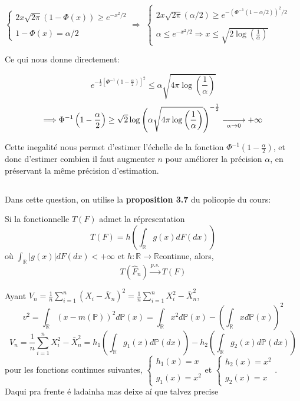 \documentclass{article}
\newcommand{\R}{\mathbb{R}}
\def\longlongrightarrow{\relbar\joinrel\relbar\joinrel\relbar\joinrel\rightarrow}
\begin{document}
$ \left\{
\begin{array}{ll}
\displaystyle 2x\sqrt{2\pi}(1-\Phi(x))\geq e^{-x^2/2} \\ \\
\displaystyle 1-\Phi(x) = \alpha/2
\end{array}
\right.
\Longrightarrow
$
$ \left\{
\begin{array}{ll}
\displaystyle 2x\sqrt{2\pi}(\alpha/2)\geq e^{-{(\Phi^{-1}(1-\alpha/2))}^2/2} \\ \\
\displaystyle \alpha \leq e^{-x^2/2} \Rightarrow x \leq \sqrt{2\log\left(\frac{1}{\alpha}\right)}
\end{array}
\right.
$


Ce qui nous donne directement:

$$e^{-\frac{1}{2}\left[\Phi^{-1}\left(1-\frac{\alpha}{2}\right)\right]^2} \leq \alpha\sqrt{4\pi\log\left(\frac{1}{\alpha}\right)}$$
$$\Longrightarrow \Phi^{-1}\left(1-\frac{\alpha}{2}\right) \geq \sqrt{2} \log\left(\alpha\sqrt{4\pi\log\left(\frac{1}{\alpha}\right)}\right)^{-\frac{1}{2}} \underset{\alpha \rightarrow 0}{\longlongrightarrow} +\infty$$

Cette inegalité nous permet d'estimer l'échelle de la fonction $\Phi^{-1}\left(1-\frac{\alpha}{2}\right)$, et donc d'estimer combien il faut augmenter $n$ pour améliorer la précision $\alpha$, en préservant la même précision d'estimation.

\subsection{}
Dans cette question, on utilise la \textbf{proposition 3.7} du policopie du cours:
\vspace{0.2in}

Si la fonctionnelle $\displaystyle T(F)$ admet la répresentation
$$T(F)=h\left(\int_{\R}g(x)dF(dx)\right)$$
où $\displaystyle \int_{\R}|g(x)|dF(dx)<+\infty$ et $\displaystyle h: \R\rightarrow\R$continue, alors,
$$ T(\hat F_n)\overset{p.s.}{\longrightarrow}T(F)$$
\vspace{0.2in}

Ayant $\displaystyle V_n=\frac{1}{n}\sum_{i=1}^n(X_i -\bar X_ n)^2=\frac{1}{n}\sum_{i=1}^nX_i^2-\bar X_n^2$,
$$v^2=\int_{\R}(x-m(\mathbb{P}))^2d\mathbb{P}(x)=\int_{\R}x^2d\mathbb{P}(x)-\left({\int_{\R}xd\mathbb{P}(x)}\right)^2$$
$$V_n=\frac{1}{n}\sum_{i=1}^nX_i^2-\bar X_n^2=h_1\left(\int_{\R}g_1(x)d\mathbb{P}(dx)\right)-h_2\left(\int_{\R}g_2(x)d\mathbb{P}(dx)\right)$$
pour les fonctions continues suivantes,
$ \left\{
\begin{array}{ll}
\displaystyle h_1(x)=x \\ \\
\displaystyle g_1(x)=x^2
\end{array}
\right.
$et
$ \left\{
\begin{array}{ll}
\displaystyle h_2(x)=x^2 \\ \\
\displaystyle g_2(x)=x
\end{array}
\right.
$.
\\ {\Huge Daqui pra frente é ladainha mas deixe aí que talvez precise}
\end{document}
